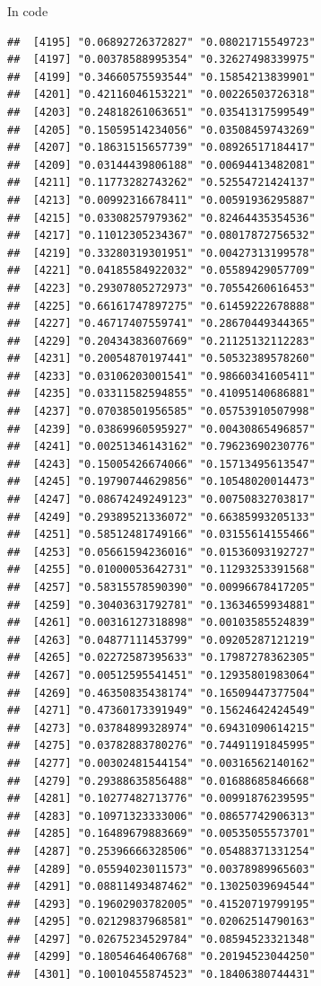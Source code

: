 \documentclass[ignorenonframetext,]{beamer}
\begin{document}
\begin{frame}[fragile]{In code}
\begin{verbatim}
##  [4195] "0.06892726372827" "0.08021715549723"
##  [4197] "0.00378588995354" "0.32627498339975"
##  [4199] "0.34660575593544" "0.15854213839901"
##  [4201] "0.42116046153221" "0.00226503726318"
##  [4203] "0.24818261063651" "0.03541317599549"
##  [4205] "0.15059514234056" "0.03508459743269"
##  [4207] "0.18631515657739" "0.08926517184417"
##  [4209] "0.03144439806188" "0.00694413482081"
##  [4211] "0.11773282743262" "0.52554721424137"
##  [4213] "0.00992316678411" "0.00591936295887"
##  [4215] "0.03308257979362" "0.82464435354536"
##  [4217] "0.11012305234367" "0.08017872756532"
##  [4219] "0.33280319301951" "0.00427313199578"
##  [4221] "0.04185584922032" "0.05589429057709"
##  [4223] "0.29307805272973" "0.70554260616453"
##  [4225] "0.66161747897275" "0.61459222678888"
##  [4227] "0.46717407559741" "0.28670449344365"
##  [4229] "0.20434383607669" "0.21125132112283"
##  [4231] "0.20054870197441" "0.50532389578260"
##  [4233] "0.03106203001541" "0.98660341605411"
##  [4235] "0.03311582594855" "0.41095140686881"
##  [4237] "0.07038501956585" "0.05753910507998"
##  [4239] "0.03869960595927" "0.00430865496857"
##  [4241] "0.00251346143162" "0.79623690230776"
##  [4243] "0.15005426674066" "0.15713495613547"
##  [4245] "0.19790744629856" "0.10548020014473"
##  [4247] "0.08674249249123" "0.00750832703817"
##  [4249] "0.29389521336072" "0.66385993205133"
##  [4251] "0.58512481749166" "0.03155614155466"
##  [4253] "0.05661594236016" "0.01536093192727"
##  [4255] "0.01000053642731" "0.11293253391568"
##  [4257] "0.58315578590390" "0.00996678417205"
##  [4259] "0.30403631792781" "0.13634659934881"
##  [4261] "0.00316127318898" "0.00103585524839"
##  [4263] "0.04877111453799" "0.09205287121219"
##  [4265] "0.02272587395633" "0.17987278362305"
##  [4267] "0.00512595541451" "0.12935801983064"
##  [4269] "0.46350835438174" "0.16509447377504"
##  [4271] "0.47360173391949" "0.15624642424549"
##  [4273] "0.03784899328974" "0.69431090614215"
##  [4275] "0.03782883780276" "0.74491191845995"
##  [4277] "0.00302481544154" "0.00316562140162"
##  [4279] "0.29388635856488" "0.01688685846668"
##  [4281] "0.10277482713776" "0.00991876239595"
##  [4283] "0.10971323333006" "0.08657742906313"
##  [4285] "0.16489679883669" "0.00535055573701"
##  [4287] "0.25396666328506" "0.05488371331254"
##  [4289] "0.05594023011573" "0.00378989965603"
##  [4291] "0.08811493487462" "0.13025039694544"
##  [4293] "0.19602903782005" "0.41520719799195"
##  [4295] "0.02129837968581" "0.02062514790163"
##  [4297] "0.02675234529784" "0.08594523321348"
##  [4299] "0.18054646406768" "0.20194523044250"
##  [4301] "0.10010455874523" "0.18406380744431"

\end{verbatim}
\end{frame}
\end{document}
